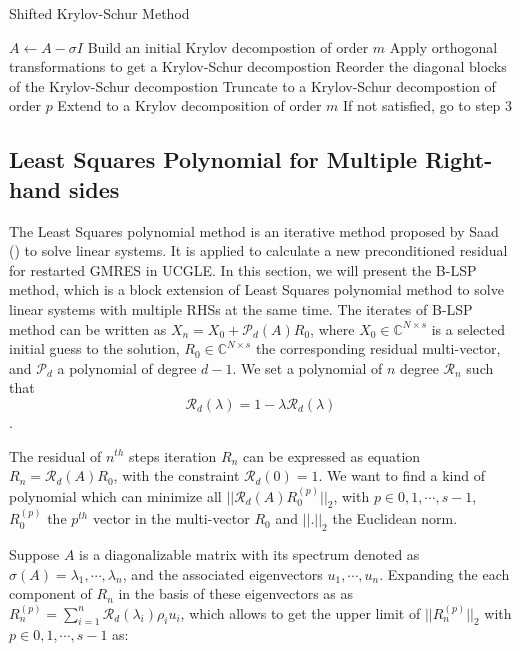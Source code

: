 \begin{algorithm}[htbp]{}
	\caption{Shifted Krylov-Schur Method}   
	\label{alg:krylov-schur-2}   
	\begin{algorithmic}[1]
		\State $A \leftarrow A-\sigma I$ 
		\State Build an initial Krylov decompostion of order $m$
		\State Apply orthogonal transformations to get a Krylov-Schur decompostion
		\State Reorder the diagonal blocks of the Krylov-Schur decompostion
		\State Truncate to a Krylov-Schur decompostion of order $p$
		\State Extend to a Krylov decomposition of order $m$
		\State If not satisfied, go to step 3
		\EndFunction
	\end{algorithmic}  
\end{algorithm}

\subsection{Least Squares Polynomial for Multiple Right-hand sides}

The Least Squares polynomial method is an iterative method proposed by Saad (\cite{saad1987least}) to solve linear systems. It is applied to calculate a new preconditioned residual for restarted GMRES in UCGLE. In this section, we will present the B-LSP method, which is a block extension of Least Squares polynomial method to solve linear systems with multiple RHSs at the same time. The iterates of B-LSP method can be written as $X_n=X_0+\mathcal{P}_d(A)R_0$, where $X_0 \in \mathbb{C}^{N\times s}$ is a selected initial guess to the solution, $R_0 \in \mathbb{C}^{N\times s}$ the corresponding residual multi-vector, and $\mathcal{P}_d$ a polynomial of degree \(d-1\). We set a polynomial of $n$ degree $\mathcal{R}_n$ such that \[\mathcal{R}_d(\lambda)=1-\lambda \mathcal{R}_d(\lambda)\].

The residual of \(n^{th}\) steps iteration \(R_n\) can be expressed as equation $R_n=\mathcal{R}_d(A)R_0$, with the constraint \(\mathcal{R}_d(0)=1\). We want to find a kind of polynomial which can minimize all \(||\mathcal{R}_d(A)R_0^{(p)}||_2\), with $p \in 0,1,\cdots,s-1$, $R_0^{(p)}$ the $p^{th}$ vector in the multi-vector $R_0$ and \(||.||_2\) the Euclidean norm.

Suppose $A$ is a diagonalizable matrix with its spectrum denoted as \(\sigma(A)=\lambda_1, \cdots, \lambda_n\), and the associated eigenvectors \(u_1, \cdots, u_n\). Expanding the each component of \(R_n\) in the basis of these eigenvectors as as $R_n^{(p)}=\sum_{i=1}^{n}\mathcal{R}_d(\lambda_i)\rho_i u_i$, which allows to get the upper limit of $||R_n^{(p)}||_2$ with $p \in 0,1,\cdots,s-1$ as:

